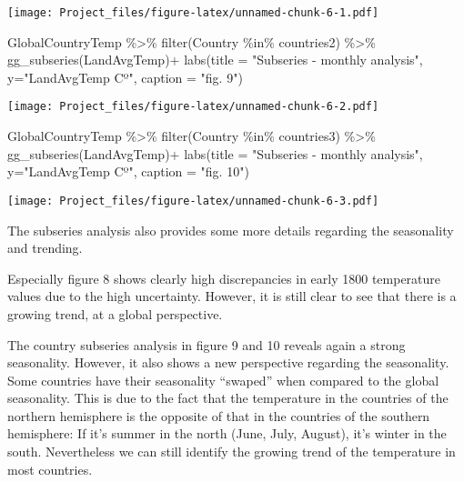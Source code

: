 \documentclass[
]{article}
\newenvironment{Shaded}{\begin{snugshade}}{\end{snugshade}}
\newcommand{\AttributeTok}[1]{\textcolor[rgb]{0.77,0.63,0.00}{#1}}
\newcommand{\FunctionTok}[1]{\textcolor[rgb]{0.00,0.00,0.00}{#1}}
\newcommand{\NormalTok}[1]{#1}
\newcommand{\SpecialCharTok}[1]{\textcolor[rgb]{0.00,0.00,0.00}{#1}}
\newcommand{\StringTok}[1]{\textcolor[rgb]{0.31,0.60,0.02}{#1}}
\begin{document}
\texttt{[image: Project\_files/figure-latex/unnamed-chunk-6-1.pdf]}

\begin{Shaded}
\begin{Highlighting}[]
\NormalTok{GlobalCountryTemp }\SpecialCharTok{\%\textgreater{}\%} 
  \FunctionTok{filter}\NormalTok{(Country }\SpecialCharTok{\%in\%}\NormalTok{ countries2) }\SpecialCharTok{\%\textgreater{}\%} 
  \FunctionTok{gg\_subseries}\NormalTok{(LandAvgTemp)}\SpecialCharTok{+}
  \FunctionTok{labs}\NormalTok{(}\AttributeTok{title =} \StringTok{"Subseries {-} monthly analysis"}\NormalTok{,}
         \AttributeTok{y=}\StringTok{"LandAvgTemp Cº"}\NormalTok{,}
       \AttributeTok{caption =} \StringTok{"fig. 9"}\NormalTok{)}
\end{Highlighting}
\end{Shaded}

\texttt{[image: Project\_files/figure-latex/unnamed-chunk-6-2.pdf]}

\begin{Shaded}
\begin{Highlighting}[]
\NormalTok{GlobalCountryTemp }\SpecialCharTok{\%\textgreater{}\%} 
  \FunctionTok{filter}\NormalTok{(Country }\SpecialCharTok{\%in\%}\NormalTok{ countries3) }\SpecialCharTok{\%\textgreater{}\%} 
  \FunctionTok{gg\_subseries}\NormalTok{(LandAvgTemp)}\SpecialCharTok{+}
  \FunctionTok{labs}\NormalTok{(}\AttributeTok{title =} \StringTok{"Subseries {-} monthly analysis"}\NormalTok{,}
         \AttributeTok{y=}\StringTok{"LandAvgTemp Cº"}\NormalTok{,}
       \AttributeTok{caption =} \StringTok{"fig. 10"}\NormalTok{)}
\end{Highlighting}
\end{Shaded}

\texttt{[image: Project\_files/figure-latex/unnamed-chunk-6-3.pdf]}

The subseries analysis also provides some more details regarding the
seasonality and trending.

Especially figure 8 shows clearly high discrepancies in early 1800
temperature values due to the high uncertainty. However, it is still
clear to see that there is a growing trend, at a global perspective.

The country subseries analysis in figure 9 and 10 reveals again a strong
seasonality. However, it also shows a new perspective regarding the
seasonality. Some countries have their seasonality ``swaped'' when
compared to the global seasonality. This is due to the fact that the
temperature in the countries of the northern hemisphere is the opposite
of that in the countries of the southern hemisphere: If it's summer in
the north (June, July, August), it's winter in the south. Nevertheless
we can still identify the growing trend of the temperature in most
countries.
\end{document}
